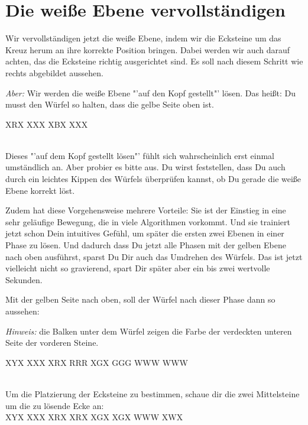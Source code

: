 \section{Die weiße Ebene vervollständigen}
\parbox{0.7\linewidth}{
Wir vervollständigen jetzt die weiße Ebene, indem wir die Ecksteine um das Kreuz herum an ihre korrekte Position bringen.
Dabei werden wir auch darauf achten, das die Ecksteine richtig ausgerichtet sind.
Es soll nach diesem Schritt wie rechts abgebildet aussehen.

\emph{Aber:} Wir werden die weiße Ebene "'auf den Kopf gestellt"' lösen.
Das heißt: Du musst den Würfel so halten, dass die gelbe Seite oben ist.
}\parbox{0.3\linewidth}{
\RubikCubeGreyAll%
%
               {X}{R}{X}
	       {X}{X}{X}%
	       {X}{B}{X}
	       {X}{X}{X}%
}\\[1em]
Dieses "'auf dem Kopf gestellt lösen"' fühlt sich wahrscheinlich erst einmal umständlich an.
Aber probier es bitte aus.
Du wirst feststellen, dass Du auch durch ein leichtes Kippen des Würfels überprüfen kannst, ob Du gerade die weiße Ebene korrekt löst.

Zudem hat diese Vorgehensweise mehrere Vorteile:
Sie ist der Einstieg in eine sehr geläufige Bewegung, die in viele Algorithmen vorkommt.
Und sie trainiert jetzt schon Dein intuitives Gefühl, um später die ersten zwei Ebenen in einer Phase zu lösen.
Und dadurch dass Du jetzt alle Phasen mit der gelben Ebene nach oben ausführst, sparst Du Dir auch das Umdrehen des Würfels.
Das ist jetzt vielleicht nicht so gravierend, spart Dir später aber ein bis zwei wertvolle Sekunden.\\[1em]
\parbox{0.7\linewidth}{
Mit der gelben Seite nach oben, soll der Würfel nach dieser Phase dann so aussehen:

\emph{Hinweis:} die Balken unter dem Würfel zeigen die Farbe der verdeckten unteren Seite der vorderen Steine.
}\parbox{0.3\linewidth}{
\RubikCubeGreyAll%
            {X}{Y}{X}
            {X}{X}{X}%
               {X}{R}{X}
	       {R}{R}{R}%
	       {X}{G}{X}
	       {G}{G}{G}%
	      {W}{W}{W}
	      {W}{W}{W}%
}\\[1em]

Um die Platzierung der Ecksteine zu bestimmen, schaue dir die zwei Mittelsteine um die zu lösende Ecke an:\\[1em]
\RubikCubeGreyAll%
            {X}{Y}{X}
            {X}{X}{X}%
               {X}{R}{X}
	       {X}{R}{X}%
	       {X}{G}{X}
	       {X}{G}{X}%
	      {W}{W}{W}
	      {X}{W}{X}%

